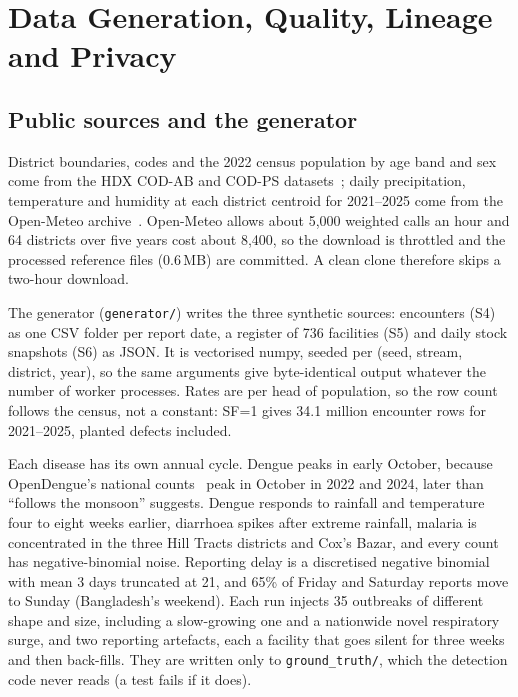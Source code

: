 \section{Data Generation, Quality, Lineage and Privacy}\label{sec:data}

\subsection{Public sources and the generator}
District boundaries, codes and the 2022 census population by age band and sex come from the HDX COD-AB and
COD-PS datasets~\cite{hdx2025codab}; daily precipitation, temperature and humidity at each district centroid
for 2021--2025 come from the Open-Meteo archive~\cite{zippenfeld2023openmeteo}. Open-Meteo allows about 5,000
weighted calls an hour and 64 districts over five years cost about 8,400, so the download is throttled and the
processed reference files (0.6\,MB) are committed. A clean clone therefore skips a two-hour download.

The generator (\texttt{generator/}) writes the three synthetic sources: encounters (S4) as one CSV folder per
report date, a register of 736 facilities (S5) and daily stock snapshots (S6) as JSON. It is vectorised numpy,
seeded per (seed, stream, district, year), so the same arguments give byte-identical output whatever the number
of worker processes. Rates are per head of population, so the row count follows the census, not a
constant: SF=1 gives 34.1 million encounter rows for 2021--2025, planted defects included.

Each disease has its own annual cycle. Dengue peaks in early October, because OpenDengue's national counts~\cite{clarke2024opendengue} peak
in October in 2022 and 2024, later than ``follows the monsoon'' suggests. Dengue responds to rainfall and
temperature four to eight weeks earlier, diarrhoea spikes after extreme rainfall, malaria is concentrated in
the three Hill Tracts districts and Cox's Bazar, and every count has negative-binomial noise. Reporting delay is
a discretised negative binomial with mean 3 days truncated at 21, and 65\% of Friday and Saturday reports move
to Sunday (Bangladesh's weekend). Each run injects 35 outbreaks of different shape and size,
including a slow-growing one and a nationwide novel respiratory surge, and two reporting artefacts, each a facility
that goes silent for three weeks and then back-fills. They are written only to \texttt{ground\_truth/}, which
the detection code never reads (a test fails if it does).

